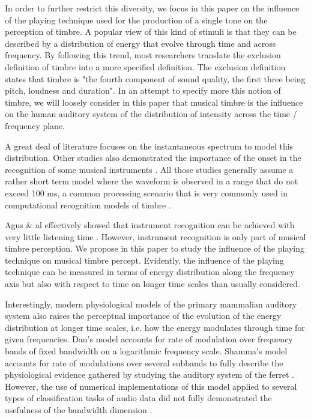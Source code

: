 \documentclass{article}
\makeatletter
\newcommand*{\ie}{i.e.\@\xspace}
\makeatother
\begin{document}
In order to further restrict this diversity, we focus in this paper on the influence of the playing technique used for the production of a single tone on the perception of timbre. A popular view of this kind of stimuli is that they can be described by a distribution of energy that evolve through time and across frequency. By following this trend, most researchers translate the exclusion definition of timbre \cite{marozeau2003dependency} into a more specified definition. The exclusion definition states that timbre is "the fourth component of sound quality, the first three being pitch, loudness and duration". In an attempt to specify more this notion of timbre, we will loosely consider in this paper that musical timbre is the influence on the human auditory system of the distribution of intensity across the time / frequency plane.

A great deal of literature focuses on the instantaneous spectrum \cite{grey1978perceptual} to model this distribution. Other studies also demonstrated the importance of the onset in the recognition of some musical instruments \cite{eronen2001comparison}. All those studies generally assume a rather short term model where the waveform is observed in a range that do not exceed 100 ms, a common processing scenario that is very commonly used in computational recognition models of timbre \cite{tzanetakis2002musical}.

Agus \& al effectively showed that instrument recognition can be achieved with very little listening time \cite{agus2012fast}. However, instrument recognition is only part of musical timbre perception. We propose in this paper to study the influence of the playing technique on musical timbre percept. Evidently, the influence of the playing technique can be measured in terms of energy distribution along the frequency axis but also with respect to time on longer time scales than usually considered.

Interestingly, modern physiological models of the primary mammalian auditory system also raises the perceptual importance of the evolution of the energy distribution at longer time scales, \ie{} how the energy modulates through time for given frequencies.  Dau's model accounts for  rate of modulation over frequency bands of fixed bandwidth on a logarithmic frequency scale\cite{dau1997modeling}. Shamma's model accounts for rate of modulations over several subbands to fully describe the physiological evidence gathered by studying the auditory system of the ferret \cite{yang1992auditory}. However, the use of numerical implementations of this model applied to several types of classification tasks of audio data did not fully demonstrated the usefulness of the bandwidth dimension \cite{mesgarani2006discrimination}.
\end{document}
